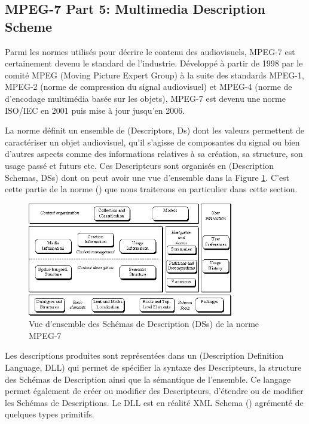 \subsection{MPEG-7 Part 5: Multimedia Description Scheme}\label{sec:mpeg7}

Parmi les normes utilisés pour décrire le contenu des audiovisuels, MPEG-7 est certainement devenu le standard de l'industrie. 
Développé à partir de 1998 par le comité MPEG (Moving Picture Expert Group) à la suite des standards MPEG-1, MPEG-2 (norme de compression du signal audiovisuel) et MPEG-4 (norme de d'encodage multimédia basée sur les objets), MPEG-7 est devenu une norme ISO/IEC en 2001 puis mise à jour jusqu'en 2006. 

La norme définit un ensemble de  (Descriptors, Ds) dont les valeurs permettent de caractériser un objet audiovisuel, qu'il s'agisse de composantes du signal ou bien d'autres aspects comme des informations relatives à sa création, sa structure, son usage passé et futurs etc.
Ces Descripteurs sont organisés en  (Description Schemas, DSs) dont on peut avoir une vue d'ensemble dans la Figure \ref{img:soa:mds}.
C'est cette partie de la norme (\cite[Part 5 : Multimedia Description Scheme]{ISO/IEC2003}) que nous traiterons en particulier dans cette section. 

\begin{figure}[ht!]
\centering
\includegraphics[width=0.8\textwidth]{images/MPEG-7-MDS.png}
\caption{Vue d'ensemble des Schémas de Description (DSs) de la norme MPEG-7}
\label{img:soa:mds}
\end{figure}

Les descriptions produites sont représentées dans un  (Description Definition Language, DLL) qui permet de spécifier la syntaxe des Descripteurs, la structure des Schémas de Description ainsi que la sémantique de l'ensemble.
Ce langage permet également de créer ou modifier des Descripteurs, d'étendre ou de modifier les Schémas de Descriptions. 
Le DLL est en réalité XML Schema (\cite{Fallside2004}) agrémenté de quelques types primitifs.


